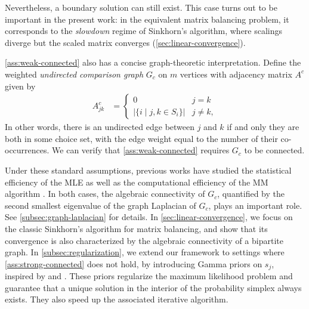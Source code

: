 Nevertheless, a boundary solution can still exist. This case turns out to be important in the present work: in the equivalent matrix balancing problem, it corresponds to the  \emph{slowdown} regime of Sinkhorn's algorithm, where scalings diverge but the scaled matrix converges (\cref{sec:linear-convergence}). 

\cref{ass:weak-connected} also has a concise graph-theoretic interpretation. Define the weighted \emph{undirected comparison graph} $G_c$ on $m$ vertices with adjacency matrix $A^c$ given by 
\begin{align*}
{A}^c_{jk} & =\begin{cases}
0 & j=k\\
|\{i\mid j,k\in S_i\}| & j\neq k,
\end{cases}
\end{align*}
In other words, there is an undirected edge between $j$ and $k$ if and only they are both in some choice set, with the edge weight equal to the number of their co-occurrences. We can verify that \cref{ass:weak-connected} requires $G_c$ to be connected.

Under these standard assumptions, previous works have studied the statistical efficiency of the MLE \citep{hajek2014minimax,shah2015estimation,seshadri2020learning} as well as the computational efficiency of the MM algorithm \citep{vojnovic2020convergence}. In both cases, the algebraic connectivity of $G_c$, quantified by the second smallest eigenvalue of the graph Laplacian of $G_c$, plays an important role. See \cref{subsec:graph-laplacian} for details.
In \cref{sec:linear-convergence}, we focus on the classic Sinkhorn's algorithm for matrix balancing, and show that its convergence is also characterized by the algebraic connectivity of a bipartite graph. In \cref{subsec:regularization}, we extend our framework to settings where \cref{ass:strong-connected} does not hold, by introducing Gamma priors on $s_j$, inspired by \citet{caron2012efficient} and \citet{maystre2017choicerank}. These priors regularize the maximum likelihood problem and guarantee that a unique solution in the interior of the probability simplex always exists. They also speed up the associated iterative algorithm.

